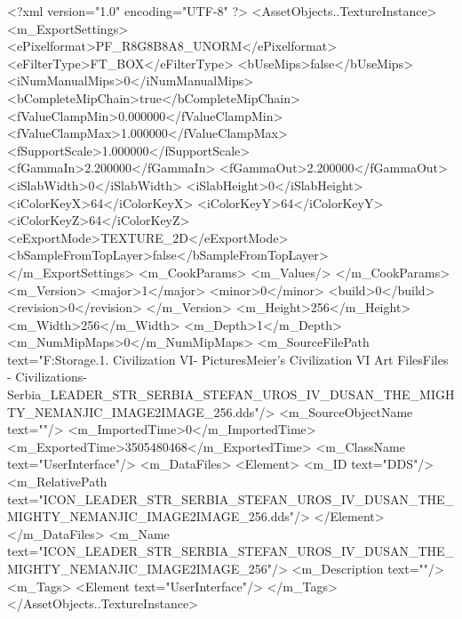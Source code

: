 <?xml version="1.0" encoding="UTF-8" ?>
<AssetObjects..TextureInstance>
	<m_ExportSettings>
		<ePixelformat>PF_R8G8B8A8_UNORM</ePixelformat>
		<eFilterType>FT_BOX</eFilterType>
		<bUseMips>false</bUseMips>
		<iNumManualMips>0</iNumManualMips>
		<bCompleteMipChain>true</bCompleteMipChain>
		<fValueClampMin>0.000000</fValueClampMin>
		<fValueClampMax>1.000000</fValueClampMax>
		<fSupportScale>1.000000</fSupportScale>
		<fGammaIn>2.200000</fGammaIn>
		<fGammaOut>2.200000</fGammaOut>
		<iSlabWidth>0</iSlabWidth>
		<iSlabHeight>0</iSlabHeight>
		<iColorKeyX>64</iColorKeyX>
		<iColorKeyY>64</iColorKeyY>
		<iColorKeyZ>64</iColorKeyZ>
		<eExportMode>TEXTURE_2D</eExportMode>
		<bSampleFromTopLayer>false</bSampleFromTopLayer>
	</m_ExportSettings>
	<m_CookParams>
		<m_Values/>
	</m_CookParams>
	<m_Version>
		<major>1</major>
		<minor>0</minor>
		<build>0</build>
		<revision>0</revision>
	</m_Version>
	<m_Height>256</m_Height>
	<m_Width>256</m_Width>
	<m_Depth>1</m_Depth>
	<m_NumMipMaps>0</m_NumMipMaps>
	<m_SourceFilePath text="F:\Mod Storage\2.1. Civilization VI\Mods\Archive - Pictures\Sid Meier's Civilization VI Art Files\Art Files - Civilizations\Civilization - Serbia\ICON_LEADER_STR_SERBIA_STEFAN_UROS_IV_DUSAN_THE_MIGHTY_NEMANJIC_IMAGE2IMAGE_256.dds"/>
	<m_SourceObjectName text=""/>
	<m_ImportedTime>0</m_ImportedTime>
	<m_ExportedTime>3505480468</m_ExportedTime>
	<m_ClassName text="UserInterface"/>
	<m_DataFiles>
		<Element>
			<m_ID text="DDS"/>
			<m_RelativePath text="ICON_LEADER_STR_SERBIA_STEFAN_UROS_IV_DUSAN_THE_MIGHTY_NEMANJIC_IMAGE2IMAGE_256.dds"/>
		</Element>
	</m_DataFiles>
	<m_Name text="ICON_LEADER_STR_SERBIA_STEFAN_UROS_IV_DUSAN_THE_MIGHTY_NEMANJIC_IMAGE2IMAGE_256"/>
	<m_Description text=""/>
	<m_Tags>
		<Element text="UserInterface"/>
	</m_Tags>
</AssetObjects..TextureInstance>

